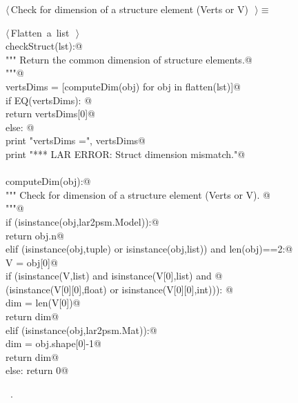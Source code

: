 \documentclass[11pt,oneside]{article}	%
\begin{document}
\begin{flushleft} \small \label{scrap34}
$\langle\,$Check for dimension of a structure element (Verts or V)\nobreak\ {\footnotesize {}}$\,\rangle\equiv$
\vspace{-1ex}
\begin{list}{}{} \item
\mbox{}\verb@@\hbox{$\langle\,$Flatten a list\nobreak\ {\footnotesize {}}$\,\rangle$}\verb@@\\
\mbox{}\verb@def checkStruct(lst):@\\
\mbox{}\verb@   """ Return the common dimension of structure elements.@\\
\mbox{}\verb@   """@\\
\mbox{}\verb@   vertsDims = [computeDim(obj) for obj in flatten(lst)]@\\
\mbox{}\verb@   if EQ(vertsDims): @\\
\mbox{}\verb@      return vertsDims[0]@\\
\mbox{}\verb@   else: @\\
\mbox{}\verb@      print "\n vertsDims =", vertsDims@\\
\mbox{}\verb@      print "*** LAR ERROR: Struct dimension mismatch."@\\
\mbox{}\verb@@\\
\mbox{}\verb@def computeDim(obj):@\\
\mbox{}\verb@   """ Check for dimension of a structure element (Verts or V). @\\
\mbox{}\verb@   """@\\
\mbox{}\verb@   if (isinstance(obj,lar2psm.Model)):@\\
\mbox{}\verb@      return obj.n@\\
\mbox{}\verb@   elif (isinstance(obj,tuple) or isinstance(obj,list)) and len(obj)==2:@\\
\mbox{}\verb@      V = obj[0]@\\
\mbox{}\verb@      if (isinstance(V,list) and isinstance(V[0],list) and @\\
\mbox{}\verb@            (isinstance(V[0][0],float) or isinstance(V[0][0],int))): @\\
\mbox{}\verb@         dim = len(V[0])@\\
\mbox{}\verb@         return dim@\\
\mbox{}\verb@   elif (isinstance(obj,lar2psm.Mat)):@\\
\mbox{}\verb@      dim = obj.shape[0]-1@\\
\mbox{}\verb@      return dim@\\
\mbox{}\verb@   else: return 0@\\
\mbox{}\verb@@{\NWsep}
\end{list}
\vspace{-1ex}
\footnotesize\addtolength{\baselineskip}{-1ex}
\begin{list}{}{\setlength{\itemsep}{-\parsep}\setlength{\itemindent}{-\leftmargin}}
\item \NWtxtMacroRefIn\ .
\end{list}
\end{flushleft}
\end{document}
